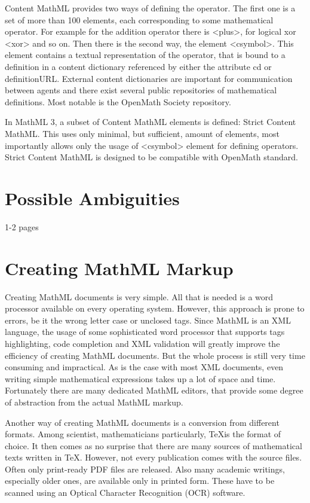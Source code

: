 \documentclass[11pt,oneside,final]{fithesis2}
\begin{document}
Content MathML provides two ways of defining the operator. The first one is a set of more than 100 elements, each corresponding to some mathematical operator. For example for the addition operator there is <plus>, for logical xor <xor> and so on. Then there is the second way, the element <csymbol>. This element contains a textual representation of the operator, that is bound to a definition in a content dictionary referenced by either the attribute cd or definitionURL. External content dictionaries are important for communication between agents and there exist several public repositories of mathematical definitions. Most notable is the OpenMath Society repository.

In MathML 3, a subset of Content MathML elements is defined: Strict Content MathML. This uses only minimal, but sufficient, amount of elements, most importantly allows only the usage of <csymbol> element for defining operators. Strict Content MathML is designed to be compatible with OpenMath standard.

\section{Possible Ambiguities}
1-2 pages
\section{Creating MathML Markup}
Creating MathML documents is very simple. All that is needed is a word processor available on every operating system. However, this approach is prone to errors, be it the wrong letter case or unclosed tags. Since MathML is an XML language, the usage of some sophisticated word processor that supports tags highlighting, code completion and XML validation will greatly improve the efficiency of creating MathML documents. But the whole process is still very time consuming and impractical. As is the case with most XML documents, even writing simple mathematical expressions takes up a lot of space and time. Fortunately there are many dedicated MathML editors, that provide some degree of abstraction from the actual MathML markup.

Another way of creating MathML documents is a conversion from different formats. Among scientist, mathematicians particularly, \TeX is the format of choice. It then comes as no surprise that there are many sources of mathematical texts written in \TeX. However, not every publication comes with the source files. Often only print-ready PDF files are released. Also many academic writings, especially older ones, are available only in printed form. These have to be scanned using an Optical Character Recognition (OCR) software. 
\end{document}
